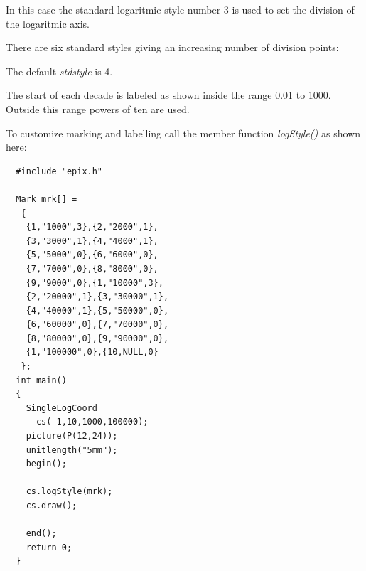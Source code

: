 \documentclass[12pt,a4paper]{article}
\begin{document}
  In this case the standard logaritmic style number 3 is used to set the division
  of the logaritmic axis.

  There are six standard styles giving an increasing number of division points:

  \begin{center}
    
  \end{center}
  \begin{center}
    
  \end{center}
  \begin{center}
    
  \end{center}
  \begin{center}
    
  \end{center}
  \begin{center}
    
  \end{center}
  \begin{center}
    
  \end{center}

  The default \textit{stdstyle} is 4.

  The start of each decade is labeled as shown inside the range 0.01 to 1000.
  Outside this range powers of ten are used.

  To customize marking and labelling call the member function \textit{logStyle()}
  as shown here:

  \begin{minipage}{8.0cm}
    \begin{lstlisting}
  #include "epix.h"

  Mark mrk[] =
   {
    {1,"1000",3},{2,"2000",1},
    {3,"3000",1},{4,"4000",1},
    {5,"5000",0},{6,"6000",0},
    {7,"7000",0},{8,"8000",0},
    {9,"9000",0},{1,"10000",3},
    {2,"20000",1},{3,"30000",1},
    {4,"40000",1},{5,"50000",0},
    {6,"60000",0},{7,"70000",0},
    {8,"80000",0},{9,"90000",0},
    {1,"100000",0},{10,NULL,0}
   };
  int main()
  {
    SingleLogCoord
      cs(-1,10,1000,100000);
    picture(P(12,24));
    unitlength("5mm");
    begin();

    cs.logStyle(mrk);
    cs.draw();

    end();
    return 0;
  }
    \end{lstlisting}
  \end{minipage}
  \begin{minipage}{5.5cm}
    
  \end{minipage}
\end{document}
